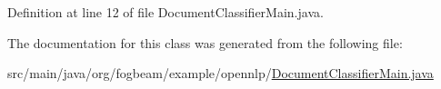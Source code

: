 Definition at line 12 of file Document\+Classifier\+Main.\+java.



The documentation for this class was generated from the following file\+:\begin{DoxyCompactItemize}
\item 
src/main/java/org/fogbeam/example/opennlp/\hyperlink{_document_classifier_main_8java}{Document\+Classifier\+Main.\+java}\end{DoxyCompactItemize}
